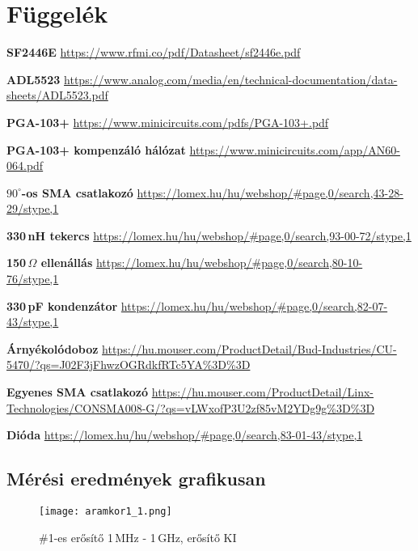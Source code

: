 \section{Függelék}
\label{sec:fuggelek}

\begin{thebibliography}{1}
	
	 \textbf{SF2446E} \url{https://www.rfmi.co/pdf/Datasheet/sf2446e.pdf}
	
	 \textbf{ADL5523}
	\url{https://www.analog.com/media/en/technical-documentation/data-sheets/ADL5523.pdf}
	
	 \textbf{PGA-103+} \url{https://www.minicircuits.com/pdfs/PGA-103+.pdf}
	
	 \textbf{PGA-103+ kompenzáló hálózat} \url{https://www.minicircuits.com/app/AN60-064.pdf}
	
	 \textbf{$90^{\circ}$-os SMA csatlakozó}
	\url{https://lomex.hu/hu/webshop/#page,0/search,43-28-29/stype,1}
	
	 \textbf{330\,nH tekercs}
	\url{https://lomex.hu/hu/webshop/#page,0/search,93-00-72/stype,1}
	
	 \textbf{150\,$\Omega$ ellenállás}
	\url{https://lomex.hu/hu/webshop/#page,0/search,80-10-76/stype,1}
	
	 \textbf{330\,pF kondenzátor}
	\url{https://lomex.hu/hu/webshop/#page,0/search,82-07-43/stype,1}
	
	 \textbf{Árnyékolódoboz}
	\url{https://hu.mouser.com/ProductDetail/Bud-Industries/CU-5470/?qs=J02F3jFhwzOGRdkfRTc5YA%3D%3D}
	
	 \textbf{Egyenes SMA csatlakozó}
	\url{https://hu.mouser.com/ProductDetail/Linx-Technologies/CONSMA008-G/?qs=vLWxofP3U2zf85vM2YDg9g%3D%3D}
	
	 \textbf{Dióda}
	\url{https://lomex.hu/hu/webshop/#page,0/search,83-01-43/stype,1}


\end{thebibliography}

\newpage

\subsection{Mérési eredmények grafikusan}

\begin{figure}[!ht]
	\centering
	\texttt{[image: aramkor1\_1.png]}
	\caption{\#1-es erősítő 1\,MHz - 1\,GHz, erősítő KI}
	\label{fig:meres1}
\end{figure}

